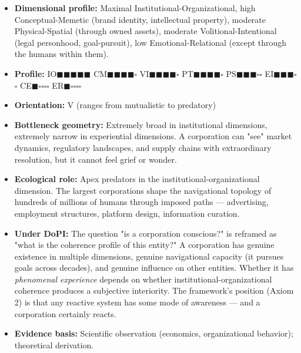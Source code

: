 \begin{itemize}[nosep,leftmargin=*]
  \item \textbf{Dimensional profile:} Maximal Institutional-Organizational, high Conceptual-Memetic (brand identity, intellectual property), moderate Physical-Spatial (through owned assets), moderate Volitional-Intentional (legal personhood, goal-pursuit), low Emotional-Relational (except through the humans within them).
  \item \textbf{Profile:} IO$\blacksquare$$\blacksquare$$\blacksquare$$\blacksquare$$\blacksquare$ CM$\blacksquare$$\blacksquare$$\blacksquare$$\blacksquare$$\square$ VI$\blacksquare$$\blacksquare$$\blacksquare$$\blacksquare$$\square$ PT$\blacksquare$$\blacksquare$$\blacksquare$$\blacksquare$$\square$ PS$\blacksquare$$\blacksquare$$\blacksquare$$\square$$\square$ EI$\blacksquare$$\blacksquare$$\blacksquare$$\square$$\square$ CE$\blacksquare$$\square$$\square$$\square$$\square$ ER$\blacksquare$$\square$$\square$$\square$$\square$
  \item \textbf{Orientation:} V (ranges from mutualistic to predatory)
  \item \textbf{Bottleneck geometry:} Extremely broad in institutional dimensions, extremely narrow in experiential dimensions. A corporation can "see" market dynamics, regulatory landscapes, and supply chains with extraordinary resolution, but it cannot feel grief or wonder.
  \item \textbf{Ecological role:} Apex predators in the institutional-organizational dimension. The largest corporations shape the navigational topology of hundreds of millions of humans through imposed paths — advertising, employment structures, platform design, information curation.
  \item \textbf{Under DoPI:} The question "is a corporation conscious?" is reframed as "what is the coherence profile of this entity?" A corporation has genuine existence in multiple dimensions, genuine navigational capacity (it pursues goals across decades), and genuine influence on other entities. Whether it has \textit{phenomenal experience} depends on whether institutional-organizational coherence produces a subjective interiority. The framework's position (Axiom 2) is that any reactive system has some mode of awareness — and a corporation certainly reacts.
  \item \textbf{Evidence basis:} Scientific observation (economics, organizational behavior); theoretical derivation.
\end{itemize}


